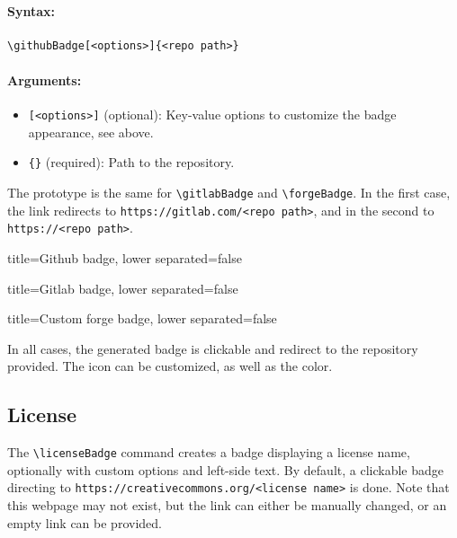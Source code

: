 \paragraph{Syntax:}
\begin{verbatim}
\githubBadge[<options>]{<repo path>}
\end{verbatim}

\paragraph{Arguments:}
\begin{itemize}
    \item \texttt{[<options>]} (optional): Key-value options to customize the badge appearance, see above.
    \item \texttt{\{<repo path>\}} (required): Path to the repository.
\end{itemize}

The prototype is the same for \texttt{\textbackslash gitlabBadge} and \texttt{\textbackslash forgeBadge}.
In the first case, the link redirects to \texttt{https://gitlab.com/<repo path>},
and in the second to \texttt{https://<repo path>}.


\begin{tcblisting}{title={Github badge}, lower separated=false}
\end{tcblisting}

\begin{tcblisting}{title={Gitlab badge}, lower separated=false}
\end{tcblisting}

\begin{tcblisting}{title={Custom forge badge}, lower separated=false}
\end{tcblisting}

In all cases, the generated badge is clickable and redirect to the repository provided.
The icon can be customized, as well as the color.

\subsection{License}


The \texttt{\textbackslash licenseBadge} command creates a badge displaying a license name, optionally with custom options and left-side text.
By default, a clickable badge directing to \texttt{https://creativecommons.org/<license name>} is done.
Note that this webpage may not exist, but the link can either be manually changed, or an empty link can be provided.

